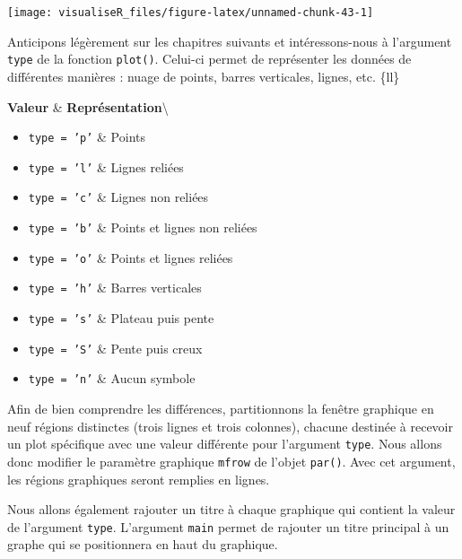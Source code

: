 \documentclass[]{article}
\providecommand{\tightlist}{%
  \setlength{\itemsep}{0pt}\setlength{\parskip}{0pt}}
\begin{document}
\begin{center}\texttt{[image: visualiseR\_files/figure-latex/unnamed-chunk-43-1]} \end{center}

Anticipons légèrement sur les chapitres suivants et intéressons-nous à l'argument \texttt{type} de la fonction \texttt{plot()}. Celui-ci permet de représenter les données de différentes manières : nuage de points, barres verticales, lignes, etc.
\{ll\}

\textbf{Valeur} \& \textbf{Représentation}\textbackslash{}

\begin{itemize}
\tightlist
\item
  \texttt{type = 'p'} \& Points
\item
  \texttt{type = 'l'} \& Lignes reliées
\item
  \texttt{type = 'c'} \& Lignes non reliées
\item
  \texttt{type = 'b'} \& Points et lignes non reliées
\item
  \texttt{type = 'o'} \& Points et lignes reliées
\item
  \texttt{type = 'h'} \& Barres verticales
\item
  \texttt{type = 's'} \& Plateau puis pente
\item
  \texttt{type = 'S'} \& Pente puis creux
\item
  \texttt{type = 'n'} \& Aucun symbole
\end{itemize}

Afin de bien comprendre les différences, partitionnons la fenêtre graphique en neuf régions distinctes (trois lignes et trois colonnes), chacune destinée à recevoir un plot spécifique avec une valeur différente pour l'argument \texttt{type}. Nous allons donc modifier le paramètre graphique \texttt{mfrow} de l'objet \texttt{par()}. Avec cet argument, les régions graphiques seront remplies en lignes.

Nous allons également rajouter un titre à chaque graphique qui contient la valeur de l'argument \texttt{type}. L'argument \texttt{main} permet de rajouter un titre principal à un graphe qui se positionnera en haut du graphique.
\end{document}
